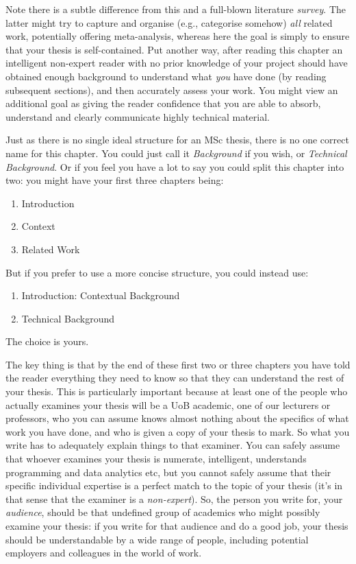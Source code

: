 \documentclass[ %
                    author={James Stephenson},
                supervisor={Dr. Edwin Simpson},
                    degree={MSc},
                     title={Bayesian Deep Learning For Extractive Test Summarisation},
                  subtitle={},
                      type={},
                      year={2023}]{dissertation}
\begin{document}
		Note there is a subtle difference from
		this and a full-blown literature {\em survey}.  The latter might try
		to capture and organise (e.g., categorise somehow) {\em all}\/ related work,
		potentially offering meta-analysis, whereas here the goal is simply to
		ensure that your thesis is self-contained.  Put another way, after reading 
		this chapter an intelligent non-expert reader with no prior knowledge of your project should have obtained enough background to 
		understand what {\em you}\/ have done (by reading subsequent sections), and then 
		accurately assess your work.  You might view an additional goal as giving 
		the reader confidence that you are able to absorb, understand and clearly 
		communicate highly technical material.
		
		Just as there is no single ideal structure for an MSc thesis, there is no one correct name for this chapter. You could just call it {\em Background}\/ if you wish, or {\em Technical Background}. Or if you feel you have a lot to say you could split this chapter into two: you might have your first three chapters being:
		\begin{enumerate}
			\item Introduction
			\item Context
			\item Related Work
		\end{enumerate}
			\noindent
			But if you prefer to use a more concise structure, you could instead use:
		\begin{enumerate}
			\item Introduction: Contextual Background
			\item Technical Background
		\end{enumerate}
		\noindent
		The choice is yours. 
		
		
		The key thing is that by the end of these first two or three chapters you have told the reader everything they need to know so that they can understand the rest of your thesis. This is particularly important because at least one of the people who actually examines your thesis will be a UoB academic, one of our lecturers or professors, who you can assume knows almost nothing about the specifics of what work you have done, and who is given a copy of your thesis to mark. So what you write has to adequately explain things to that examiner. You can safely assume that whoever examines your thesis is numerate, intelligent, understands programming and data analytics etc, but you cannot safely assume that their specific individual expertise is a perfect match to the topic of your thesis (it's in that sense that the examiner is a {\em non-expert}). So, the person you write for, your {\em audience}, should be that undefined group of academics who might possibly examine your thesis: if you write for that audience and do a good job, your thesis should be understandable by a wide range of people, including potential employers and colleagues in the world of work.
		
\end{document}
